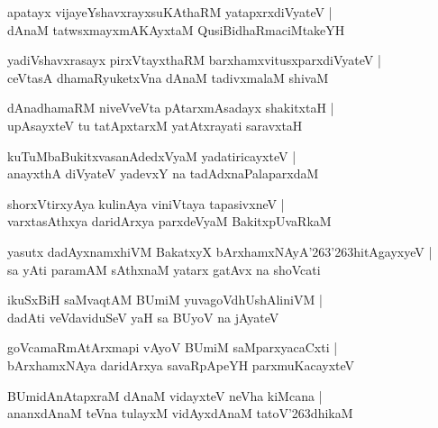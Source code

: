 \documentclass[twoside,12pt,openright]{book}
\def\S{\char'263}
\newcounter{shloka}[chapter]
\begin{document}
\begin{shloka}
apatayx vijayeYshavxrayxsuKAthaRM yatapxrxdiVyateV |\\
dAnaM tatwsxmayxmAKAyxtaM QusiBidhaRmaciMtakeYH 
\end{shloka}

\begin{shloka}
yadiVshavxrasayx pirxVtayxthaRM barxhamxvitusxparxdiVyateV |\\
ceVtasA dhamaRyuketxVna dAnaM tadivxmalaM shivaM 
\end{shloka}

\begin{shloka}
dAnadhamaRM niveVveVta pAtarxmAsadayx shakitxtaH |\\
upAsayxteV tu tatApxtarxM yatAtxrayati saravxtaH 
\end{shloka}

\begin{shloka}
kuTuMbaBukitxvasanAdedxVyaM yadatiricayxteV |\\
anayxthA diVyateV yadevxY na tadAdxnaPalaparxdaM 
\end{shloka}

\begin{shloka}
shorxVtirxyAya kulinAya viniVtaya tapasivxneV |\\
varxtasAthxya daridArxya parxdeVyaM BakitxpUvaRkaM 
\end{shloka}

\begin{shloka}
yasutx dadAyxnamxhiVM BakatxyX bArxhamxNAyA\S\S hitAgayxyeV |\\
sa yAti paramAM sAthxnaM yatarx gatAvx na shoVcati
\end{shloka}

\begin{shloka}
ikuSxBiH saMvaqtAM BUmiM yuvagoVdhUshAliniVM |\\
dadAti veVdaviduSeV yaH sa BUyoV na jAyateV 
\end{shloka}

\begin{shloka}
goVcamaRmAtArxmapi vAyoV BUmiM saMparxyacaCxti |\\
bArxhamxNAya daridArxya savaRpApeYH parxmuKacayxteV 
\end{shloka}

\begin{shloka}
BUmidAnAtapxraM dAnaM vidayxteV neVha kiMcana |\\
ananxdAnaM teVna tulayxM vidAyxdAnaM tatoV\S dhikaM 
\end{shloka}
\end{document}
